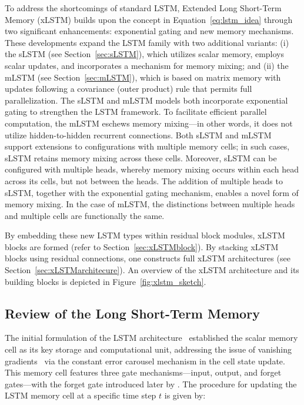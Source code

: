 To address the shortcomings of standard LSTM, Extended Long Short-Term Memory (xLSTM) builds upon the concept in Equation~\eqref{eq:lstm_idea} through two significant enhancements: exponential gating and new memory mechanisms. These developments expand the LSTM family with two additional variants: (i) the sLSTM (see Section~\ref{sec:sLSTM}), which utilizes scalar memory, employs scalar updates, and incorporates a mechanism for memory mixing; and (ii) the mLSTM (see Section~\ref{sec:mLSTM}), which is based on matrix memory with updates following a covariance (outer product) rule that permits full parallelization. The sLSTM and mLSTM models both incorporate exponential gating to strengthen the LSTM framework. To facilitate efficient parallel computation, the mLSTM eschews memory mixing—in other words, it does not utilize hidden-to-hidden recurrent connections. Both sLSTM and mLSTM support extensions to configurations with multiple memory cells; in such cases, sLSTM retains memory mixing across these cells. Moreover, sLSTM can be configured with multiple heads, whereby memory mixing occurs within each head across its cells, but not between the heads. The addition of multiple heads to sLSTM, together with the exponential gating mechanism, enables a novel form of memory mixing. In the case of mLSTM, the distinctions between multiple heads and multiple cells are functionally the same.

By embedding these new LSTM types within residual block modules, xLSTM blocks are formed (refer to Section~\ref{sec:xLSTMblock}). By stacking xLSTM blocks using residual connections, one constructs full xLSTM architectures (see Section~\ref{sec:xLSTMarchitecure}). An overview of the xLSTM architecture and its building blocks is depicted in Figure~\ref{fig:xlstm_sketch}.

\subsection{Review of the Long Short-Term Memory}
\label{sec:orgLSTM}

The initial formulation of the LSTM architecture~\citep{Hochreiter:91,Hochreiter:97nips,Hochreiter:97} established the scalar memory cell as its key storage and computational unit, addressing the issue of vanishing gradients~\citep{Hochreiter:91,Hochreiter:00book} via the constant error carousel mechanism in the cell state update. This memory cell features three gate mechanisms—input, output, and forget gates—with the forget gate introduced later by \citet{Gers:00}. The procedure for updating the LSTM memory cell at a specific time step $t$ is given by:

